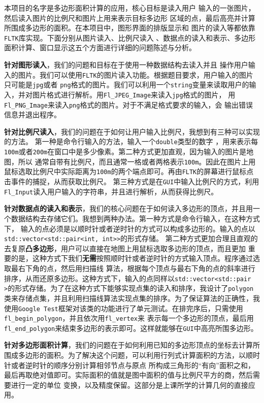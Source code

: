 本项目的名字是多边形面积计算的应用，核心目标是读入用户
输入的一张图片，然后读入图片的比例尺和图片上用来表示目标多边形
区域的点，最后高亮并计算所围成多边形的面积。在本项目中，图形界面的排版显示和
图片的读入等都依靠\texttt{FLTK}库实现。下面分别从图片读入、比例尺读入
、数据点的读入和表示、多边形面积计算、窗口显示这五个方面进行详细的问题陈述与分析。

\textbf{针对图形读入}，我们的问题和目标在于使用一种数据结构去读入并且
操作用户输入的图片。我们可以使用\texttt{FLTK}的图片读入功能。根据题目要求，用户输入的图片只可能是\texttt{jpg}或者
\texttt{png}格式的图片。我们可以利用一个\texttt{string}变量来读取用户的输入，并对图片格式进行解析。用\texttt{Fl_JPEG_Image}来读入\texttt{jpg}格式的图片，
用\texttt{Fl_PNG_Image}来读入\texttt{png}格式的图片。对于不满足格式要求的输入，会
输出错误信息并退出程序。

\textbf{针对比例尺读入}，我们的问题在于如何让用户输入比例尺，我想到有三种可以实现的方法。
第一种是命令行输入的方法，输入一个\texttt{double}类型的数字
，用来表示每\texttt{100m}或者\texttt{200m}在窗口中是多少像素。第二种方式更加直观，因为输入的图片是地图，所以
通常自带有比例尺，而且通常一格或者两格表示\texttt{100m}。因此在图片上用鼠标选取比例尺中实际距离为\texttt{100m}的两个端点即可。再由\texttt{FLTK}的屏幕进行鼠标点击事件的捕捉，从而获取比例尺。
第三种方式是在\texttt{GUI}中输入比例尺的方式，利用\texttt{Fl_Input}读入用户输入的字符串，并且进行解析，从而获得比例尺。

\textbf{针对数据点的读入和表示}，我们的核心问题在于如何读入多边形的顶点，并且用一个数据结构去存储它们。我想到两种办法。第一种方式是命令行输入，在这种方式下，
输入的点必须是以顺时针或者逆时针的方式可以构成多边形的。输入的点以\texttt{std::vector<std::pair<int, int>>}的形式存储。
第二种方式更加合理且直观的去复原\textbf{凸多边形}，用户可以直接在地图上用鼠标选取多边形的顶点，而且更加
重要的是，这种方式下我们\textbf{无需}按照顺时针或者逆时针的方式输入顶点。程序通过选取最右下角的点，然后用扫描线
算法，根据每个顶点与最右下角的点的斜率进行排序，从而还原多边形。这种方式下，输入的点同样以\texttt{std::vector<std::pair\\<int, int>>}的形式存储。为了在这种方式下能够实现点集的读入和排序，我设计了\texttt{polygon}
类来存储点集，并且利用扫描线算法实现点集的排序。为了保证算法的正确性，我使用\texttt{Google Test}框架对该类的功能进行了单元测试。在排完序后，只需使用\texttt{fl_begin_polygon}，并且依次用\texttt{fl_vertex}来
表示每一个多边形的顶点，最后用\texttt{fl_end_polygon}来结束多边形的表示即可。这样就能够在\texttt{GUI}中高亮所围多边形。

\textbf{针对多边形面积计算}，我们的问题在于如何利用已知的多边形顶点的坐标去计算所围成多边形的面积。为了解决这个问题，可以利用行列式计算面积的方法，以顺时针或者逆时针的顺序分别计算相邻节点与原点
所构成三角形的“有向”面积之和，最后再取绝对值即可。实际面积的值就是图中面积的值与比例尺平方的商，然后需要进行一定的单位
变换，以及精度保留。这部分是上课所学的计算几何的直接应用。

